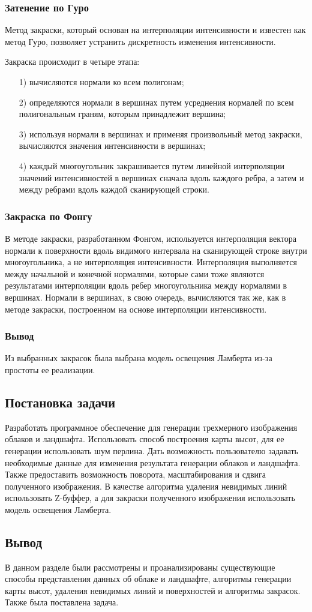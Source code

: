 \documentclass[14pt, a4paper]{extarticle}
\begin{document}
\subsubsection{Затенение по Гуро}
Метод закраски, который основан на интерполяции интенсивности и известен как метод Гуро, позволяет устранить дискретность изменения интенсивности.\par
Закраска происходит в четыре этапа:
\begin{enumerate}
	\item[1)] вычисляются нормали ко всем полигонам;
	\item[2)] определяются нормали в вершинах путем усреднения нормалей по всем полигональным граням, которым принадлежит вершина;
	\item[3)] используя нормали в вершинах и применяя произвольный метод закраски, вычисляются значения интенсивности в вершинах;
	\item[4)] каждый многоугольник закрашивается путем линейной интерполяции значений интенсивностей в вершинах сначала вдоль каждого ребра, а затем и между ребрами вдоль каждой сканирующей строки. 
\end{enumerate}
\subsubsection{Закраска по Фонгу}
В методе закраски, разработанном Фонгом, используется интерполяция вектора нормали к поверхности вдоль видимого интервала на сканирующей строке внутри многоугольника, а не интерполяция интенсивности. Интерполяция выполняется между начальной и конечной нормалями, которые сами тоже являются результатами интерполяции вдоль ребер многоугольника между нормалями в вершинах. Нормали в вершинах, в свою очередь, вычисляются так же, как в методе закраски, построенном на основе интерполяции интенсивности.
\subsubsection{Вывод}
Из выбранных закрасок была выбрана модель освещения Ламберта из-за простоты ее реализации.
\subsection{Постановка задачи}
Разработать программное обеспечение для генерации трехмерного изображения облаков и ландшафта. Использовать способ построения карты высот, для ее генерации использовать шум перлина. Дать возможность пользователю задавать необходимые данные для изменения результата генерации облаков и ландшафта. Также предоставить возможность поворота, масштабирования и сдвига полученного изображения. В качестве алгоритма удаления невидимых линий использовать Z-буффер, а для закраски полученного изображения использовать модель освещения Ламберта.
\subsection{Вывод}
В данном разделе были рассмотрены и проанализированы существующие способы представления данных об облаке и ландшафте, алгоритмы генерации карты высот, удаления невидимых линий и поверхностей и алгоритмы закрасок. Также была поставлена задача.
\end{document}
